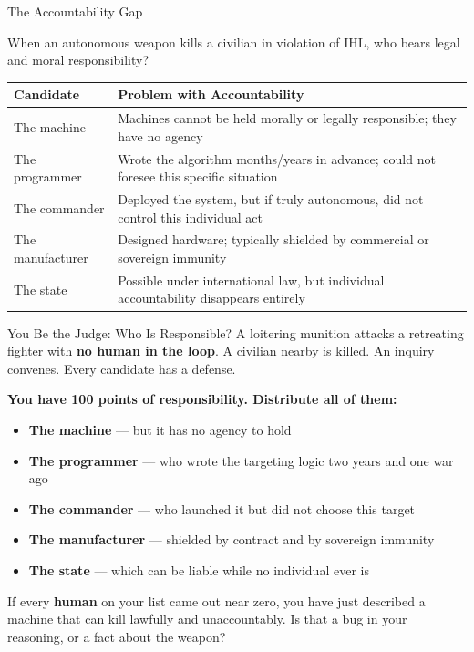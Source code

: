 \documentclass[aspectratio=169,11pt]{beamer}
\begin{document}
\begin{frame}[shrink=1]{The Accountability Gap}
\begin{argumentbox}
\small
When an autonomous weapon kills a civilian in violation of IHL, who bears legal and moral responsibility?
\vspace{0.1cm}

\scriptsize
\begin{tabular}{@{}p{2.8cm}p{9.1cm}@{}}
\toprule
\textbf{Candidate} & \textbf{Problem with Accountability} \\
\midrule
The machine & Machines cannot be held morally or legally responsible; they have no agency \\
The programmer & Wrote the algorithm months/years in advance; could not foresee this specific situation \\
The commander & Deployed the system, but if truly autonomous, did not control this individual act \\
The manufacturer & Designed hardware; typically shielded by commercial or sovereign immunity \\
The state & Possible under international law, but individual accountability disappears entirely \\
\bottomrule
\end{tabular}
\end{argumentbox}

\parencite{hrw_losing_humanity_2012}
\end{frame}
\begin{frame}[shrink=8]{You Be the Judge: Who Is Responsible?}
A loitering munition attacks a retreating fighter with \textbf{no human in the loop}. A civilian nearby is killed. An inquiry convenes. Every candidate has a defense.

\vspace{0.2em}
\textbf{You have 100 points of responsibility. Distribute all of them:}
\begin{itemize}
    \item \textbf{The machine} --- but it has no agency to hold
    \item \textbf{The programmer} --- who wrote the targeting logic two years and one war ago
    \item \textbf{The commander} --- who launched it but did not choose this target
    \item \textbf{The manufacturer} --- shielded by contract and by sovereign immunity
    \item \textbf{The state} --- which can be liable while no individual ever is
\end{itemize}

\begin{discussionbox}
If every \textbf{human} on your list came out near zero, you have just described a machine that can kill lawfully and unaccountably. Is that a bug in your reasoning, or a fact about the weapon?
\end{discussionbox}
\end{frame}
\end{document}
